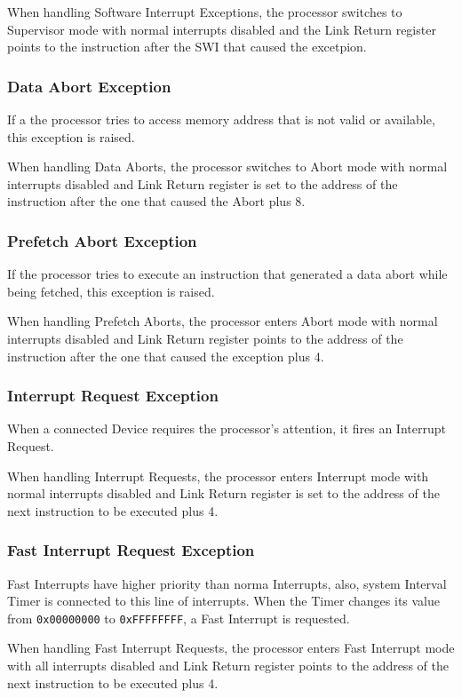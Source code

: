 When handling Software Interrupt Exceptions, the processor switches to Supervisor mode with normal interrupts disabled and the Link Return register points to the instruction after the SWI that caused the excetpion.

\subsubsection{Data Abort Exception}
If a the processor tries to access memory address that is not valid or available, this exception is raised.

When handling Data Aborts, the processor switches to Abort mode with normal interrupts disabled and Link Return register is set to the address of the instruction after the one that caused the Abort plus 8.


\subsubsection{Prefetch Abort Exception}
If the processor tries to execute an instruction that generated a data abort while being fetched, this exception is raised.

When handling Prefetch Aborts, the processor enters Abort mode with normal interrupts disabled and Link Return register points to the address of the instruction after the one that caused the exception plus 4.

\subsubsection{Interrupt Request Exception}
When a connected Device requires the processor's attention, it fires an Interrupt Request.

When handling Interrupt Requests, the processor enters Interrupt mode with normal interrupts disabled and Link Return register is set to the address of the next instruction to be executed plus 4.

\subsubsection{Fast Interrupt Request Exception}
Fast Interrupts have higher priority than norma Interrupts, also, system Interval Timer is connected to this line of interrupts. When the Timer changes its value from \texttt{0x00000000} to \texttt{0xFFFFFFFF}, a Fast Interrupt is requested.

When handling Fast Interrupt Requests, the processor enters Fast Interrupt mode with all interrupts disabled and Link Return register points to the address of the next instruction to be executed plus 4.

